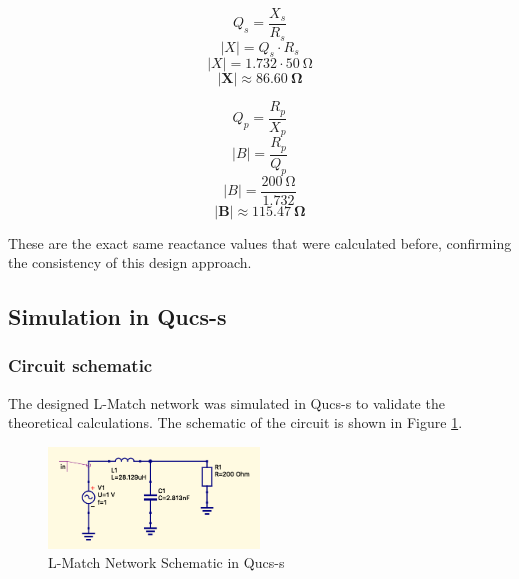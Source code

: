 \begin{equation}
    Q_s = \frac{X_s}{R_s}
\end{equation}
\begin{equation}
    |X| = Q_s \cdot R_s
\end{equation}
\begin{equation}
    |X| = 1.732 \cdot \SI{50}{\ohm}
\end{equation}
\begin{equation}
    \mathbf{|X| \approx \SI{86.60}{\ohm}}
\end{equation}

\begin{equation}
    Q_p = \frac{R_p}{X_p}
\end{equation}
\begin{equation}
    |B| = \frac{R_p}{Q_p}
\end{equation}
\begin{equation}
    |B| = \frac{\SI{200}{\ohm}}{1.732}
\end{equation}
\begin{equation}
    \mathbf{|B| \approx \SI{115.47}{\ohm}}
\end{equation}

These are the exact same reactance values that were calculated before, confirming the consistency of this design approach.

\subsection{Simulation in Qucs-s}

\subsubsection{Circuit schematic}
The designed L-Match network was simulated in Qucs-s to validate the theoretical calculations. The schematic of the circuit is shown in Figure \ref{fig:qucs_lmatch}.

\begin{figure}[H]
    \centering
    \includegraphics[width=0.5\textwidth]{Images/Qucs_LMatch.png}
    \caption{L-Match Network Schematic in Qucs-s}
    \label{fig:qucs_lmatch}
\end{figure}

